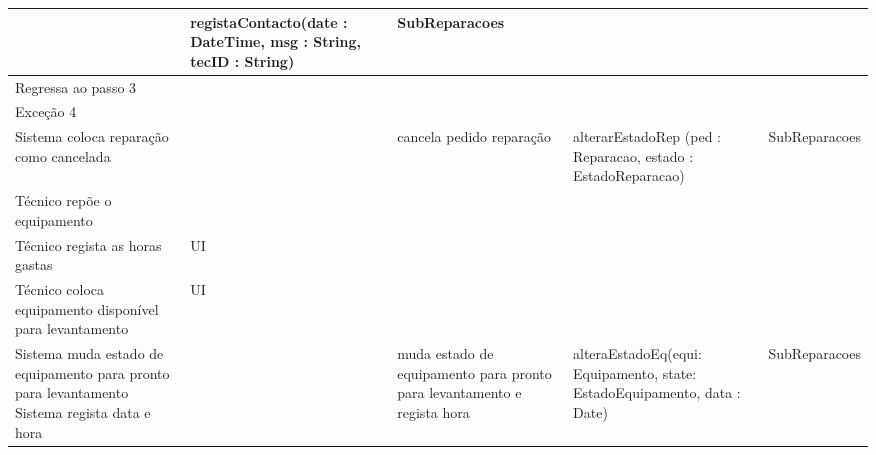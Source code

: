 \documentclass[../relatorio.tex]{subfiles}
\begin{document}
\begin{landscape}
\begin{table}[!h]
\begin{tabular}{|p{5cm}|p{1cm}|p{4cm}|p{6cm}|p{3cm}|}
                     & registaContacto(date : DateTime, msg : String, tecID : String)
                     & SubReparacoes
            \\
            \hline
            Regressa ao passo 3
                     & 
                     & 
                     & 
                     & 
            \\
            \hline
            \rowcolor{red!30}
            Exceção 4 &                                                  &                  &     &            \\
            \hline
            Sistema coloca reparação como cancelada
                     & 
                     & cancela pedido reparação
                     & alterarEstadoRep (ped : Reparacao, estado : EstadoReparacao)
                     & SubReparacoes
            \\
            \hline
            Técnico repõe o equipamento
                     & 
                     & 
                     & 
                     & 
            \\
            \hline
            \rowcolor{yellow}
            Técnico regista as horas gastas
                     & UI
                     & 
                     & 
                     & 
            \\
            \hline
            \rowcolor{yellow}
            Técnico coloca equipamento disponível para levantamento
                     & UI
                     & 
                     & 
                     & 
            \\
            \hline
            Sistema muda estado de equipamento para pronto para levantamento
            Sistema regista data e hora
                     & 
                     & muda estado de equipamento para pronto para levantamento e regista hora
                     & alteraEstadoEq(equi: Equipamento, state: EstadoEquipamento, data : Date)
                     & SubReparacoes
            \\
            \hline
        \end{tabular}
    \end{table}
\end{landscape}
\end{document}
